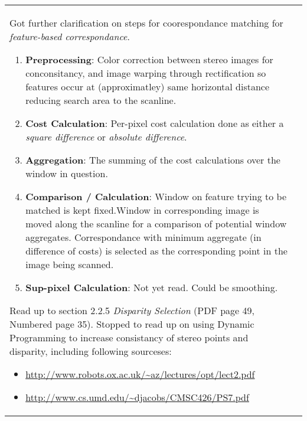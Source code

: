 \begin{longtable}{l p{12cm} }
{\par Got further clarification on steps for coorespondance matching for \textit{feature-based correspondance}.\newline
\par\begin{enumerate}
\item \textbf{Preprocessing}: Color correction between stereo images for conconsitancy, and image warping through rectification so features occur at (approximatley) same horizontal distance reducing search area to the scanline.
\item \textbf{Cost Calculation}: Per-pixel cost calculation done as either a \textit{square difference} or \textit{absolute difference}.
\item \textbf{Aggregation}: The summing of the cost calculations over the window in question.
\item \textbf{Comparison / Calculation}: Window on feature trying to be matched is kept fixed.Window in corresponding image  is moved along the scanline for a comparison of potential window aggregates. Correspondance with minimum aggregate (in difference of costs) is selected as the corresponding point in the image being scanned.
\item \textbf{Sup-pixel Calculation}: Not yet read. Could be smoothing.\newline
\end{enumerate}
\par Read up to section 2.2.5 \textit{Disparity Selection} (PDF page 49, Numbered page 35). Stopped to read up on using Dynamic Programming to increase consistancy of stereo points and disparity, including following sourceses:\newline
\par\begin{itemize}
\item \url{http://www.robots.ox.ac.uk/~az/lectures/opt/lect2.pdf}
\item \url{http://www.cs.umd.edu/~djacobs/CMSC426/PS7.pdf}
\end{itemize}

}
\end{longtable}

